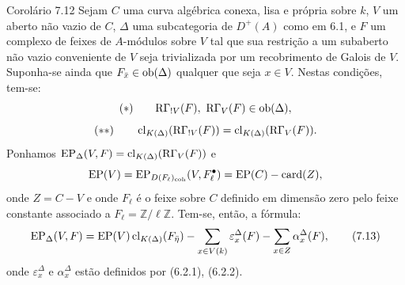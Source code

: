 \begin{statement}{Corolário 7.12}
Sejam $C$ uma curva algébrica conexa, lisa e própria sobre $k$, $V$ um aberto não vazio de $C$, $\Delta$ uma subcategoria de $D^+(A)$ como em 6.1, e $F$ um complexo de feixes de $A$-módulos sobre $V$ tal que sua restrição a um subaberto não vazio conveniente de $V$ seja trivializada por um recobrimento de Galois de $V$. Suponha-se ainda que $F_{\bar x}\in\operatorname{ob}(\Delta)$ qualquer que seja $x\in V$. Nestas condições, tem-se:
\[
(*)\qquad \mathrm{R}\Gamma_{!V}(F),\ \mathrm{R}\Gamma_V(F)\in\operatorname{ob}(\Delta),
\]
\[
(**)\qquad
\operatorname{cl}_{K(\Delta)}(\mathrm{R}\Gamma_{!V}(F))=\operatorname{cl}_{K(\Delta)}(\mathrm{R}\Gamma_V(F)).
\]
Ponhamos $\operatorname{EP}_\Delta(V,F)=\operatorname{cl}_{K(\Delta)}(\mathrm{R}\Gamma_V(F))$ e
\[
\operatorname{EP}(V)=\operatorname{EP}_{D(F_\ell)_{\mathrm{coh}}}(V,F_\ell^\bullet)=\operatorname{EP}(C)-\operatorname{card}(Z),
\]
onde $Z=C-V$ e onde $F_\ell$ é o feixe sobre $C$ definido em dimensão zero pelo feixe constante associado a $F_\ell=\mathbb Z/\ell\mathbb Z$. Tem-se, então, a fórmula:
\[
\operatorname{EP}_\Delta(V,F)
=
\operatorname{EP}(V)\operatorname{cl}_{K(\Delta)}(F_{\bar\eta})
-\sum_{x\in V(k)}\varepsilon_x^\Delta(F)
-\sum_{x\in Z}\alpha_x^\Delta(F),
\tag{7.13}
\]
onde $\varepsilon_x^\Delta$ e $\alpha_x^\Delta$ estão definidos por (6.2.1), (6.2.2).
\end{statement}
